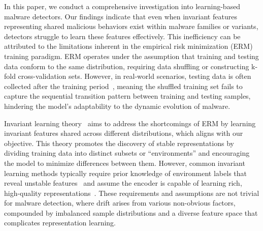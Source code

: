 In this paper, we conduct a comprehensive investigation into learning-based malware detectors. Our findings indicate that even when invariant features representing shared malicious behaviors exist within malware families or variants, detectors struggle to learn these features effectively. This inefficiency can be attributed to the limitations inherent in the empirical risk minimization (ERM) training paradigm. ERM operates under the assumption that training and testing data conform to the same distribution, requiring data shuffling or constructing k-fold cross-validation sets. However, in real-world scenarios, testing data is often collected after the training period~\cite{tesseract}, meaning the shuffled training set fails to capture the sequential transition pattern between training and testing samples, hindering the model's adaptability to the dynamic evolution of malware.

Invariant learning theory~\cite{IR_intro} aims to address the shortcomings of ERM by learning invariant features shared across different distributions, which aligns with our objective. This theory promotes the discovery of stable representations by dividing training data into distinct subsets or ``environments'' and encouraging the model to minimize differences between them. However, common invariant learning methods typically require prior knowledge of environment labels that reveal unstable features~\cite{environment_label, env_label} and assume the encoder is capable of learning rich, high-quality representations~\cite{yang2024invariant}. These requirements and assumptions are not trivial for malware detection, where drift arises from various non-obvious factors, compounded by imbalanced sample distributions and a diverse feature space that complicates representation learning.


